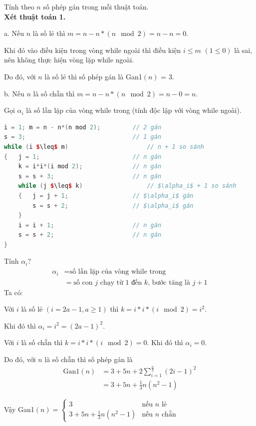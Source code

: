 \documentclass[12pt, a4paper, fleqn]{article}
\begin{document}
	Tính theo $n$ số phép gán trong mỗi thuật toán. \\
	
	\textbf{Xét thuật toán 1.}
	
	a. Nếu $n$ là số lẻ thì $m = n - n*(n \mod 2) = n - n = 0$.
	
	Khi đó vào điều kiện trong vòng while ngoài thì điều kiện $i \leq m$ $(1 \leq 0)$ là sai, nên không thực hiện vòng lặp while ngoài.
	
	Do đó, với $n$ là số lẻ thì số phép gán là Gan1$(n)$ = 3.
	
	b. Nếu $n$ là số chẵn thì $m = n - n*(n \mod 2) = n - 0 = n$.
	
	Gọi $\alpha_i$ là số lần lặp của vòng while trong (tính độc lập với vòng while ngoài).
	
	\begin{lstlisting}[language = C++, mathescape, texcl]
i = 1; m = n - n*(n mod 2);			// 2 gán
s = 3;								// 1 gán
while (i $\leq$ m)						// n + 1 so sánh
{	j = 1;							// n gán
	k = i*i*(i mod 2);				// n gán
	s = s + 3;						// n gán
	while (j $\leq$ k)					// $\alpha_i$ + 1 so sánh
	{	j = j + 1;					// $\alpha_i$ gán
		s = s + 2;					// $\alpha_i$ gán
	}
	i = i + 1;						// n gán
	s = s + 2;						// n gán
}
	\end{lstlisting}
	
	Tính $\alpha_i$?
	\begin{align*}
	\alpha_i &= \text{số lần lặp của vòng while trong} \\
			 &= \text{số con $j$ chạy từ 1 đến $k$, bước tăng là $j + 1$}
	\end{align*}
	Ta có:
	
	Với $i$ là số lẻ $(i = 2a - 1, a \geq 1)$ thì $k = i*i*(i \mod 2) = i^2$.
	
	Khi đó thì $\alpha_i = i^2 = (2a - 1)^2$.
	
	Với $i$ là số chẵn thì $k = i*i*(i \mod 2) = 0$. Khi đó thì $\alpha_i = 0$.
	
	Do đó, với $n$ là số chẵn thì số phép gán là
	\begin{align*}
	\text{Gan1}(n) &= 3 + 5n + 2 \sum_{i = 1}^{\frac{n}{2}} (2i - 1)^2 \\
				   &= 3 + 5n + \frac{1}{3} n(n^2 - 1)
	\end{align*}
	
	Vậy Gan1$(n) = {
		\begin{cases}
		3 & {\text{nếu $n$ lẻ}} \\
		\displaystyle 3 + 5n + \frac{1}{3} n(n^2 - 1) & {\text{nếu $n$ chẵn}}
		\end{cases}
	}$
\end{document}
